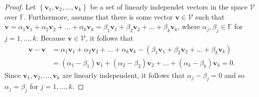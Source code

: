 \documentclass[12pt]{article}
\begin{document}
    \begin{proof}
      Let $\left\{ \mathbf{v}_{1},\mathbf{v}_{2},\dots,\mathbf{v}_{k} \right\}$ be a set of linearly independet vectors in the space $\mathcal{V}$ over $\mathbb{F}$. Furthermore, assume that there is some vector $\mathbf{v}\in \mathcal{V}$ such that $\mathbf{v} = \alpha_{1}\mathbf{v}_{1} + \alpha_{2}\mathbf{v}_{2} + \dots+\alpha_{k}\mathbf{v}_{k} = \beta_{1}\mathbf{v}_{1} + \beta_{2}\mathbf{v}_{2}+ \dots + \beta_{k}\mathbf{v}_{k}$, where $\alpha_{j},\beta_{j}\in \mathbb{F}$ for $j=1,\dots,k$. Because $\mathbf{v}\in \mathcal{V}$, it follows that
    \begin{align*}
      \mathbf{v} - \mathbf{v} &= \alpha_{1}\mathbf{v}_{1} + \alpha_{2}\mathbf{v}_{2} + \dots+\alpha_{k}\mathbf{v}_{k} - \left(\beta_{1}\mathbf{v}_{1} + \beta_{2}\mathbf{v}_{2}+ \dots + \beta_{k}\mathbf{v}_{k}\right)\\
      &= (\alpha_{1}-\beta_{1})\mathbf{v}_{1} + (\alpha_{2}-\beta_{2})\mathbf{v}_{2} + \dots + (\alpha_{k}-\beta_{k})\mathbf{v}_{k} = 0.
    \end{align*}
    Since $\mathbf{v}_{1}, \mathbf{v}_{2},\dots,\mathbf{v}_{k}$ are linearly independent, it follows that $\alpha_{j} - \beta_{j}=0$ and so $\alpha_{j}=\beta_{j}$ for $j=1,\dots,k$.
    \end{proof}
\end{document}
